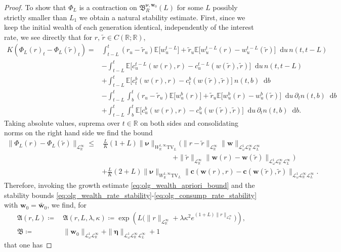\documentclass[10pt,a4paper]{amsart}
\theoremstyle{plain}
\theoremstyle{plain}
\theoremstyle{definition}
\theoremstyle{remark}
\newcommand{\TV}{\text{TV}}
\newcommand{\bc}{\mathbf{c}}
\newcommand{\bmeta}{\boldsymbol{\eta}}
\newcommand{\bnu}{\boldsymbol{\nu}}
\newcommand{\bw}{\mathbf{w}}
\newcommand{\dd}{\mathop{}\!\mathrm{d}}
\newcommand{\fB}{\mathfrak{B}}
\newcommand{\mbE}{\mathbb{E}}
\newcommand{\mbR}{\mathbb{R}}
\newcommand{\mfA}{\mathfrak{A}}
\newcommand{\mfB}{\mathfrak{B}}
\newcommand{\msL}{\mathscr{L}}
\begin{document}
\begin{proof}
To show that $\Phi_L$ is a contraction on $  \fB^{\bnu,\bw_0}_R(L)$ for some $L$ possibly strictly smaller than $L_1$ we obtain a natural stability estimate. First, since we keep the initial wealth of each generation identical, independently of the interest rate, we see directly that for $r,\,\tilde{r} \in C(\mbR;\mbR)$,
%
 \begin{align*}
      K\left(\Phi_L(r)_t-\Phi_L(\tilde{r})_t\right) =& \int_{t-L}^{t} (r_u-\tilde{r}_u) \mbE\big[w^{t-L}_u\big] + \tilde{r}_u\mbE\big[w^{t-L}_u(r) - w^{t-L}_u(\tilde{r})\big]\dd u \,n(t,t-L) \\
       &- \int_{t-L}^{t}\mbE\big[c^{t-L}_u(w(r),r)-c^{t-L}_u(w(\tilde{r}),\tilde{r})\big] \dd u \,n(t,t-L)\\
       &+ \int_{t-L}^{t} \mbE\big[ c^b_{t}(w(r),r)- c^b_t(w(\tilde{r}),\tilde{r})\big] \ n(t,b)\dd b\\
       &- \int_{t-L}^{t} \int_b^{t} (r_u -\tilde{r}_u)\mbE\big[w^b_u(r)\big] +\tilde{r}_u \mbE\big[w^b_u(r)-w^b_u(\tilde{r})\big] \dd u \, \partial_t n(t,b)\dd b\\
       &+\int_{t-L}^t \int_b^t \mbE\big[c^b_u(w(r),r)-c^b_u(w(\tilde{r}),\tilde{r})\big] \dd u \, \partial_t n(t,b)\dd b.
   \end{align*}
%
Taking absolute values, suprema over $t\in \mbR$ on both sides and consolidating norms on the right hand side we find the bound
%
 \begin{align*}
       \|\Phi_L(r)-\Phi_L(\tilde{r})\|_{\msL^\infty_{\mbR}} \leq &\,  \frac{L}{K}(1+L)\|\bnu\|_{W^{1,\infty}_{\mbR}\TV_L}\bigg(\|r-\tilde{r}\|_{\msL^\infty_\mbR} \|\bw\|_{\msL^1_\omega \msL^\infty_{\mbR}\msL^\infty_L} \\
       &\qquad \qquad \qquad \qquad \qquad  + \|\tilde{r}\|_{\msL^\infty_{\mbR}}\|\bw(r) - \bw(\tilde{r})\|_{\msL^1_\omega \msL^\infty_{\mbR}\msL^\infty_L} \bigg)\\
       &+\frac{L}{K}(2+L)\|\bnu\|_{W^{1,\infty}_{\mbR}\TV_L}  \|\bc(\bw(r),r)-\bc(\bw(\tilde{r}),\tilde{r})\|_{\msL^1_\omega \msL^\infty_{\mbR}\msL^\infty_L}.
   \end{align*}
%
Therefore, invoking the growth estimate \eqref{eq:olg_wealth_apriori_bound} and the stability bounds \eqref{eq:olg_wealth_rate_stability}-\eqref{eq:olg_consump_rate_stability} with $\bw_0 = \tilde{\bw_0}$, we find, for 
%
\begin{align*}
    \mfA(r,L)\coloneqq &\, \mfA(r,L,\lambda,\kappa) \coloneqq \exp\left(L\big(\|r\|_{\msL^\infty_\mbR} + \lambda \kappa^2 e^{(1+L)\|r\|_{\msL^\infty_{\mbR}} } \big)\right),\\
    \mfB \coloneqq  &\, \|\bw_0\|_{\msL^1_\omega \msL^\infty_\mbR } +    \|\bmeta\|_{ \msL^1_\omega \msL^\infty_{\mbR} \msL^\infty_{L}} + 1 
\end{align*}
%
that one has
%


\end{proof}
\end{document}
